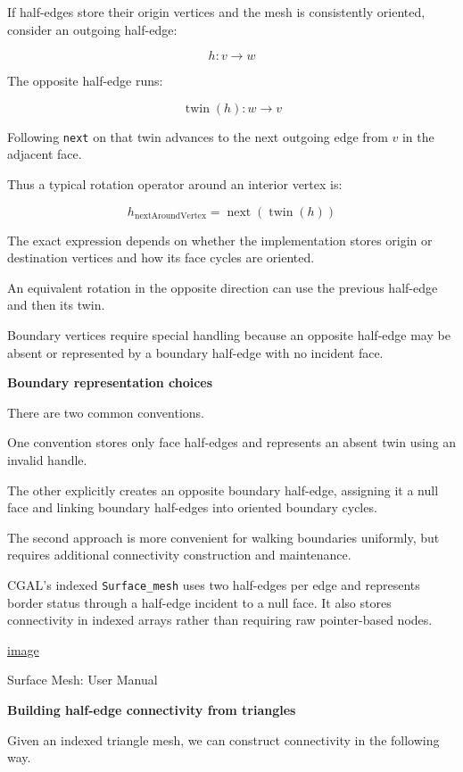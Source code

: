 If half-edges store their origin vertices and the mesh is consistently oriented, consider an outgoing half-edge:

\[
h:v\rightarrow w
\]

The opposite half-edge runs:

\[
\operatorname{twin}(h):w\rightarrow v
\]

Following \texttt{next} on that twin advances to the next outgoing edge from \(v\) in the adjacent face.

Thus a typical rotation operator around an interior vertex is:

\[
\boxed{ h_{\mathrm{nextAroundVertex}} = \operatorname{next}(\operatorname{twin}(h)) }
\]

The exact expression depends on whether the implementation stores origin or destination vertices and how its face cycles are oriented.

An equivalent rotation in the opposite direction can use the previous half-edge and then its twin.

Boundary vertices require special handling because an opposite half-edge may be absent or represented by a boundary half-edge with no incident face.

\textbf{Boundary representation choices}

There are two common conventions.

One convention stores only face half-edges and represents an absent twin using an invalid handle.

The other explicitly creates an opposite boundary half-edge, assigning it a null face and linking boundary half-edges into oriented boundary cycles.

The second approach is more convenient for walking boundaries uniformly, but requires additional connectivity construction and maintenance.

CGAL's indexed \texttt{Surface\_mesh} uses two half-edges per edge and represents border status through a half-edge incident to a null face. It also stores connectivity in indexed arrays rather than requiring raw pointer-based nodes. 

\href{https://www.google.com/s2/favicons?domain=https://doc.cgal.org&sz=32}{image}

Surface Mesh: User Manual

\textbf{Building half-edge connectivity from triangles}

Given an indexed triangle mesh, we can construct connectivity in the following way.

